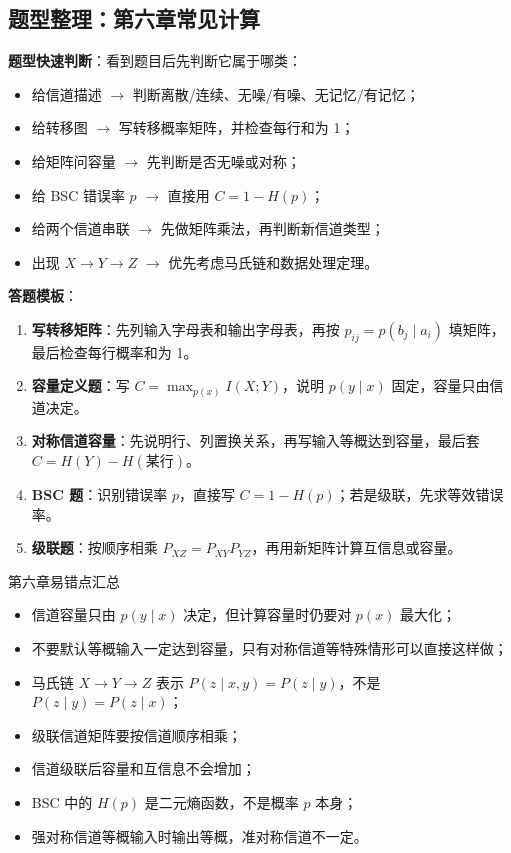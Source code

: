 \subsection{题型整理：第六章常见计算}

\textbf{题型快速判断}：看到题目后先判断它属于哪类：
\begin{itemize}
  \item 给信道描述 $\to$ 判断离散/连续、无噪/有噪、无记忆/有记忆；
  \item 给转移图 $\to$ 写转移概率矩阵，并检查每行和为 1；
  \item 给矩阵问容量 $\to$ 先判断是否无噪或对称；
  \item 给 BSC 错误率 $p$ $\to$ 直接用 $C=1-H(p)$；
  \item 给两个信道串联 $\to$ 先做矩阵乘法，再判断新信道类型；
  \item 出现 $X\to Y\to Z$ $\to$ 优先考虑马氏链和数据处理定理。
\end{itemize}

\textbf{答题模板}：
\begin{enumerate}
  \item \textbf{写转移矩阵}：先列输入字母表和输出字母表，再按 $p_{ij}=p(b_j\mid a_i)$ 填矩阵，最后检查每行概率和为 1。
  \item \textbf{容量定义题}：写 $C=\max_{p(x)}I(X;Y)$，说明 $p(y\mid x)$ 固定，容量只由信道决定。
  \item \textbf{对称信道容量}：先说明行、列置换关系，再写输入等概达到容量，最后套 $C=H(Y)-H(\text{某行})$。
  \item \textbf{BSC 题}：识别错误率 $p$，直接写 $C=1-H(p)$；若是级联，先求等效错误率。
  \item \textbf{级联题}：按顺序相乘 $P_{XZ}=P_{XY}P_{YZ}$，再用新矩阵计算互信息或容量。
\end{enumerate}

\begin{warningBox}{第六章易错点汇总}
\begin{itemize}
  \item 信道容量只由 $p(y\mid x)$ 决定，但计算容量时仍要对 $p(x)$ 最大化；
  \item 不要默认等概输入一定达到容量，只有对称信道等特殊情形可以直接这样做；
  \item 马氏链 $X\to Y\to Z$ 表示 $P(z\mid x,y)=P(z\mid y)$，不是 $P(z\mid y)=P(z\mid x)$；
  \item 级联信道矩阵要按信道顺序相乘；
  \item 信道级联后容量和互信息不会增加；
  \item BSC 中的 $H(p)$ 是二元熵函数，不是概率 $p$ 本身；
  \item 强对称信道等概输入时输出等概，准对称信道不一定。
\end{itemize}
\end{warningBox}


